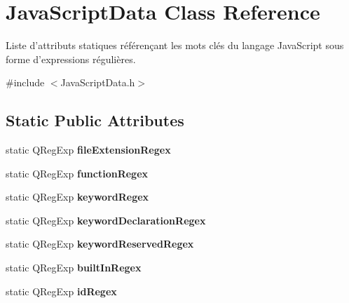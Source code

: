 \hypertarget{class_java_script_data}{
\section{JavaScriptData Class Reference}
\label{class_java_script_data}
}


Liste d'attributs statiques référençant les mots clés du langage JavaScript sous forme d'expressions régulières.  




{\ttfamily \#include $<$JavaScriptData.h$>$}

\subsection*{Static Public Attributes}
\begin{DoxyCompactItemize}
\item 
\hypertarget{class_java_script_data_af4bb8f4cafba3c3cff91e83d8e342d65}{
static QRegExp {\bfseries fileExtensionRegex}}
\label{class_java_script_data_af4bb8f4cafba3c3cff91e83d8e342d65}

\item 
\hypertarget{class_java_script_data_afe4e4e2b90c82c1a1c5020a0ea510c97}{
static QRegExp {\bfseries functionRegex}}
\label{class_java_script_data_afe4e4e2b90c82c1a1c5020a0ea510c97}

\item 
\hypertarget{class_java_script_data_adbeb81433614b5216aa12f5a613b6652}{
static QRegExp {\bfseries keywordRegex}}
\label{class_java_script_data_adbeb81433614b5216aa12f5a613b6652}

\item 
\hypertarget{class_java_script_data_ac8c70dbb61aedceb53d782668090369f}{
static QRegExp {\bfseries keywordDeclarationRegex}}
\label{class_java_script_data_ac8c70dbb61aedceb53d782668090369f}

\item 
\hypertarget{class_java_script_data_a8664eef17cd8a603ce269bd24976495a}{
static QRegExp {\bfseries keywordReservedRegex}}
\label{class_java_script_data_a8664eef17cd8a603ce269bd24976495a}

\item 
\hypertarget{class_java_script_data_a52b08ea8f9bed73c9940be4d84c33d3e}{
static QRegExp {\bfseries builtInRegex}}
\label{class_java_script_data_a52b08ea8f9bed73c9940be4d84c33d3e}

\item 
\hypertarget{class_java_script_data_a139fcc2f2169ae1db5ef16a45013ea53}{
static QRegExp {\bfseries idRegex}}
\label{class_java_script_data_a139fcc2f2169ae1db5ef16a45013ea53}


\end{DoxyCompactItemize}
